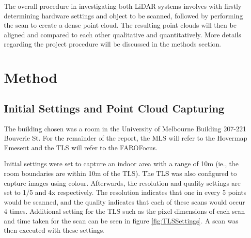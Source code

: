 \documentclass[man]{apa7}
\begin{document}
The overall procedure in investigating both LiDAR systems involves with firstly determining hardware settings and object to be scanned, followed by performing the scan to create a dense point cloud. The resulting point clouds will then be aligned and compared to each other qualitative and quantitatively. More details regarding the project procedure will be discussed in the methods section.
\newpage
\section{Method}

\subsection{Initial Settings and Point Cloud Capturing}

The building chosen was a room in the University of Melbourne Building 207-221 Bouverie St. For the remainder of the report, the MLS will refer to the Hovermap Emesent and the TLS will refer to the FAROFocus.

Initial settings were set to capture an indoor area with a range of 10m (ie., the room boundaries are within 10m of the TLS). The TLS was also configured to capture images using colour. Afterwards, the resolution and quality settings are set to 1/5 and 4x respectively. The resolution indicates that one in every 5 points would be scanned, and the quality indicates that each of these scans would occur 4 times. Additional setting for the TLS such as the pixel dimensions of each scan and time taken for the scan can be seen in figure \ref{fig:TLSSettings}. A scan was then executed with these settings.
\end{document}
